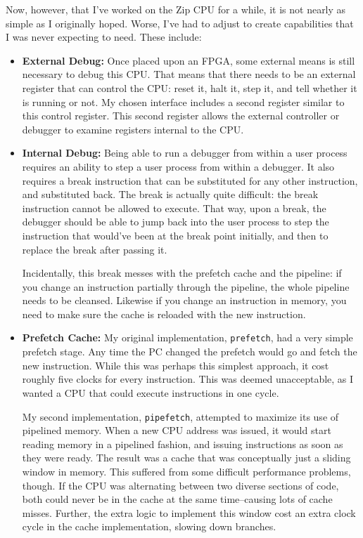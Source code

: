 \documentclass{gqtekspec}
\begin{document}
Now, however, that I've worked on the Zip CPU for a while, it is not nearly
as simple as I originally hoped.  Worse, I've had to adjust to create
capabilities that I was never expecting to need.  These include:
\begin{itemize}
\item {\bf External Debug:} Once placed upon an FPGA, some external means is
	still necessary to debug this CPU.  That means that there needs to be
	an external register that can control the CPU: reset it, halt it, step
	it, and tell whether it is running or not.  My chosen interface
	includes a second register similar to this control register.  This
	second register allows the external controller or debugger to examine
	registers internal to the CPU.

\item {\bf Internal Debug:} Being able to run a debugger from within
	a user process requires an ability to step a user process from
	within a debugger.  It also requires a break instruction that can
	be substituted for any other instruction, and substituted back.
	The break is actually quite difficult: the break instruction cannot be
	allowed to execute.  That way, upon a break, the debugger should
	be able to jump back into the user process to step the instruction
	that would've been at the break point initially, and then to 
	replace the break after passing it.

	Incidentally, this break messes with the prefetch cache and the
	pipeline: if you change an instruction partially through the pipeline,
	the whole pipeline needs to be cleansed.  Likewise if you change
	an instruction in memory, you need to make sure the cache is reloaded
	with the new instruction.

\item {\bf Prefetch Cache:} My original implementation, {\tt prefetch}, had
	a very simple prefetch stage.  Any time the PC changed the prefetch
	would go and fetch the new instruction.  While this was perhaps this
	simplest approach, it cost roughly five clocks for every instruction. 
	This was deemed unacceptable, as I wanted a CPU that could execute
	instructions in one cycle. 

	My second implementation, {\tt pipefetch}, attempted to maximize its
	use of pipelined memory.  When a new CPU address was issued, it would
	start reading memory in a pipelined fashion, and issuing instructions
	as soon as they were ready.  The result was a cache that was
	conceptually just a sliding window in memory.  This suffered
	from some difficult performance problems, though.  If the CPU was
	alternating between two diverse sections of code, both could never be
	in the cache at the same time--causing lots of cache misses.  Further,
	the extra logic to implement this window cost an extra clock cycle
	in the cache implementation, slowing down branches.


\end{itemize}
\end{document}

